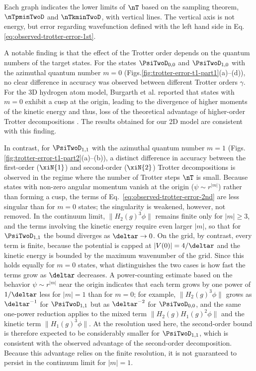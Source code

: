 \documentclass[manuscript_main.tex]{subfiles}
\begin{document}
Each graph indicates the lower limits of $\nT$ based on the sampling theorem,
$\nTpminTwoD$ and $\nTkminTwoD$, with vertical lines. The vertical axis is not
energy, but error regarding wavefunction defined with the left hand side in
Eq.\eqref{eq:observed-trotter-error-1st}.

A notable finding is that the effect of the Trotter order depends on the quantum
numbers of the target states. For the states $\PsiTwoD_{0,0}$ and
$\PsiTwoD_{1,0}$ with the azimuthal quantum number $m=0$
(Figs.\ref{fig:trotter-error-t1-part1}(a)--(d)), no clear difference in accuracy
was observed between different Trotter orders $\gamma$. For the 3D hydrogen atom
model, Burgarth et al. reported that states with $m=0$ exhibit a cusp at the
origin, leading to the divergence of higher moments of the kinetic energy and
thus, loss of the theoretical advantage of higher-order Trotter decompositions
\cite{Burgarth2024.PhysRevResearch.6.043155}. The results obtained for our 2D
model are consistent with this finding.

In contrast, for $\PsiTwoD_{1,1}$ with the azimuthal quantum number $m=1$ (Figs.
\ref{fig:trotter-error-t1-part2}(a)--(b)), a distinct difference in accuracy
between the first-order ($\xiN{1}$) and second-order ($\xiN{2}$) Trotter
decompositions is observed in the regime where the number of Trotter steps $\nT$
is small. Because states with non-zero angular momentum vanish at the origin
($\psi\sim r^{|m|}$) rather than forming a cusp, the terms of
Eq.~\eqref{eq:observed-trotter-error-2nd} are less singular than for $m=0$
states; the singularity is weakened, however, not removed. In the continuum
limit, $\|H_2(g)^3\phi\|$ remains finite only for $|m|\ge3$, and the terms
involving the kinetic energy require even larger $|m|$, so that for
$\PsiTwoD_{1,1}$ the bound diverges as $\deltar\to0$. On the grid, by contrast,
every term is finite, because the potential is capped at $|V(0)|=4/\deltar$ and
the kinetic energy is bounded by the maximum wavenumber of the grid. Since this
holds equally for $m=0$ states, what distinguishes the two cases is how fast
the terms grow as $\deltar$ decreases. A power-counting estimate based on the
behavior $\psi\sim r^{|m|}$ near the origin indicates that each term grows by
one power of $1/\deltar$ less for $|m|=1$ than for $m=0$; for example,
$\|H_2(g)^3\phi\|$ grows as $\deltar^{-1}$ for $\PsiTwoD_{1,1}$ but as
$\deltar^{-2}$ for $\PsiTwoD_{0,0}$, and the same one-power reduction applies to
the mixed term $\|H_2(g)H_1(g)^2\phi\|$ and the kinetic term
$\|H_1(g)^3\phi\|$. At the resolution used here, the second-order bound is
therefore expected to be considerably smaller for $\PsiTwoD_{1,1}$, which is
consistent with the observed advantage of the second-order decomposition.
Because this advantage relies on the finite resolution, it is not guaranteed to
persist in the continuum limit for $|m|=1$.
\end{document}
